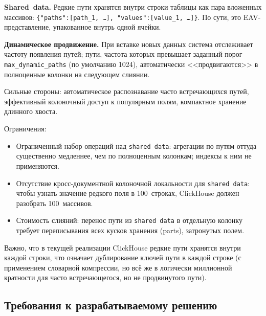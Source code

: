 \textbf{Shared~data.} Редкие пути хранятся внутри строки таблицы
как пара вложенных массивов: \texttt{\{"paths":[path\_1, \ldots],
"values":[value\_1, \ldots]\}}. По сути, это EAV-представление,
упакованное внутрь одной ячейки.

\textbf{Динамическое продвижение.} При вставке новых данных
система отслеживает частоту появления путей; пути, частота которых
превышает заданный порог \texttt{max\_dynamic\_paths} (по умолчанию
1024), автоматически <<продвигаются>> в полноценные колонки на
следующем слиянии.

Сильные стороны: автоматическое распознавание часто встречающихся
путей, эффективный колоночный доступ к популярным полям, компактное
хранение длинного хвоста.

Ограничения:
\begin{itemize}
    \item Ограниченный набор операций над \texttt{shared~data}:
    агрегации по путям оттуда существенно медленнее, чем по
    полноценным колонкам; индексы к ним не применяются.
    \item Отсутствие кросс-документной колоночной локальности для
    \texttt{shared~data}: чтобы узнать значение редкого поля в
    100~строках, ClickHouse должен разобрать 100~массивов.
    \item Стоимость слияний: перенос пути из \texttt{shared~data} в
    отдельную колонку требует переписывания всех кусков хранения
    (parts), затронутых полем.
\end{itemize}

Важно, что в текущей реализации ClickHouse редкие пути хранятся
внутри каждой строки, что означает дублирование ключей пути в
каждой строке (с применением словарной компрессии, но всё же в
логически миллионной кратности для часто встречающегося, но не
продвинутого пути).

\subsection{Требования к разрабатываемому решению}

